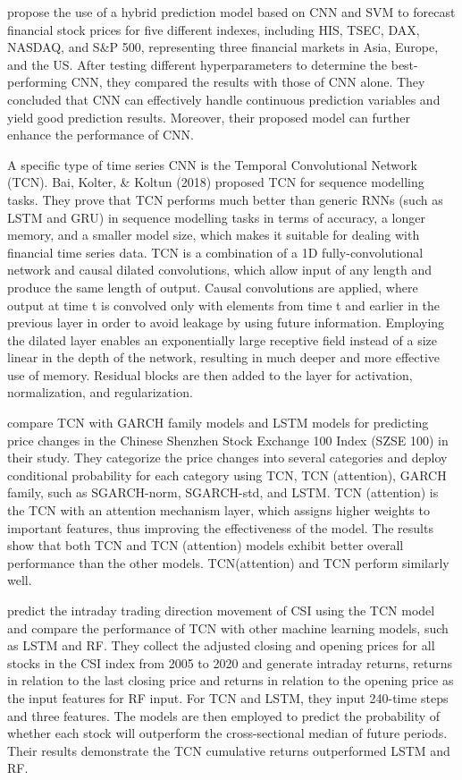 \documentclass{article}
\begin{document}
\cite{cao2019stock} propose the use of a hybrid prediction model based on CNN and SVM to forecast financial stock prices for five different indexes, including HIS, TSEC, DAX, NASDAQ, and S\&P 500, representing three financial markets in Asia, Europe, and the US. After testing different hyperparameters to determine the best-performing CNN, they compared the results with those of CNN alone. They concluded that CNN can effectively handle continuous prediction variables and yield good prediction results. Moreover, their proposed model can further enhance the performance of CNN.

A specific type of time series CNN is the Temporal Convolutional Network (TCN). Bai, Kolter, \& Koltun (2018) \citep{bai2018empirical} proposed TCN for sequence modelling tasks. They prove that TCN performs much better than generic RNNs (such as LSTM and GRU) in sequence modelling tasks in terms of accuracy, a longer memory, and a smaller model size, which makes it suitable for dealing with financial time series data. TCN is a combination of a 1D fully-convolutional network and causal dilated convolutions, which allow input of any length and produce the same length of output. Causal convolutions are applied, where output at time t is convolved only with elements from time t and earlier in the previous layer in order to avoid leakage by using future information. Employing the dilated layer enables an exponentially large receptive field instead of a size linear in the depth of the network, resulting in much deeper and more effective use of memory. Residual blocks are then added to the layer for activation, normalization, and regularization.

\cite{dai2022price} compare TCN with GARCH family models and LSTM models for predicting price changes in the Chinese Shenzhen Stock Exchange 100 Index (SZSE 100) in their study. They categorize the price changes into several categories and deploy conditional probability for each category using TCN, TCN (attention), GARCH family, such as  SGARCH-norm, SGARCH-std, and LSTM. TCN (attention) is the TCN with an attention mechanism layer, which assigns higher weights to important features, thus improving the effectiveness of the model. The results show that both TCN and TCN (attention) models exhibit better overall performance than the other models. TCN(attention) and TCN perform similarly well.

\cite{xiang2023predicting} predict the intraday trading direction movement of CSI using the TCN model and compare the performance of TCN with other machine learning models, such as LSTM and RF. They collect the adjusted closing and opening prices for all stocks in the CSI index from 2005 to 2020 and generate intraday returns, returns in relation to the last closing price and returns in relation to the opening price as the input features for RF input. For TCN and LSTM, they input 240-time steps and three features. The models are then employed to predict the probability of whether each stock will outperform the cross-sectional median of future periods. Their results demonstrate the TCN cumulative returns outperformed LSTM and RF. 
\end{document}
